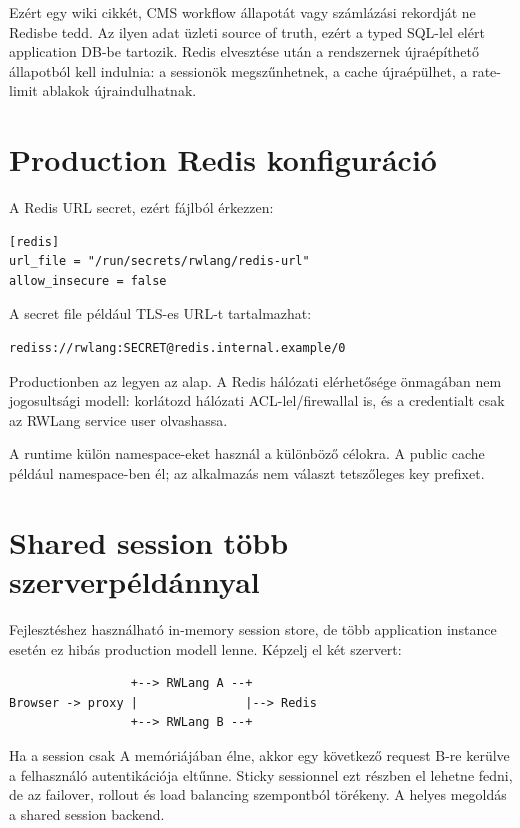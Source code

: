 Ezért egy wiki cikkét, CMS workflow állapotát vagy számlázási rekordját ne Redisbe tedd. Az ilyen adat üzleti source of truth, ezért a typed SQL-lel elért application DB-be tartozik. Redis elvesztése után a rendszernek újraépíthető állapotból kell indulnia: a sessionök megszűnhetnek, a cache újraépülhet, a rate-limit ablakok újraindulhatnak.

\section{Production Redis konfiguráció}

A Redis URL secret, ezért fájlból érkezzen:

\begin{lstlisting}
[redis]
url_file = "/run/secrets/rwlang/redis-url"
allow_insecure = false
\end{lstlisting}

A secret file például TLS-es URL-t tartalmazhat:

\begin{lstlisting}
rediss://rwlang:SECRET@redis.internal.example/0
\end{lstlisting}

Productionben az  legyen az alap. A Redis hálózati elérhetősége önmagában nem jogosultsági modell: korlátozd hálózati ACL-lel/firewallal is, és a credentialt csak az RWLang service user olvashassa.

A runtime külön namespace-eket használ a különböző célokra. A public cache például  namespace-ben él; az alkalmazás nem választ tetszőleges key prefixet.

\section{Shared session több szerverpéldánnyal}

Fejlesztéshez használható in-memory session store, de több application instance esetén ez hibás production modell lenne. Képzelj el két szervert:

\begin{lstlisting}
                 +--> RWLang A --+
Browser -> proxy |               |--> Redis
                 +--> RWLang B --+
\end{lstlisting}

Ha a session csak A memóriájában élne, akkor egy következő request B-re kerülve a felhasználó autentikációja eltűnne. Sticky sessionnel ezt részben el lehetne fedni, de az failover, rollout és load balancing szempontból törékeny. A helyes megoldás a shared session backend.

